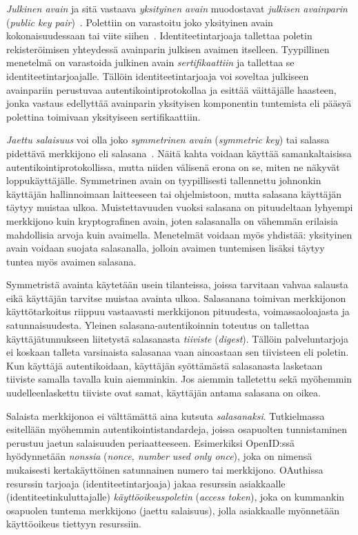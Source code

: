 \documentclass[finnish,gradu]{tktltiki}
\begin{document}
  \emph{Julkinen avain} ja sitä vastaava \emph{yksityinen avain} muodostavat \emph{julkisen avainparin} (\emph{public key pair})~\cite{NIST_SP800-63-1}. Polettiin on varastoitu joko yksityinen avain kokonaisuudessaan tai viite siihen~\cite{NIST_SP800-63-1}. Identiteetintarjoaja tallettaa poletin rekisteröimisen yhteydessä avainparin julkisen avaimen itselleen. Tyypillinen menetelmä on varastoida julkinen avain \emph{sertifikaattiin} ja tallettaa se identiteetintarjoajalle. Tällöin identiteetintarjoaja voi soveltaa julkiseen avainpariin perustuvaa autentikointiprotokollaa ja esittää väittäjälle haasteen, jonka vastaus edellyttää avainparin yksityisen komponentin tuntemista eli pääsyä polettina toimivaan yksityiseen sertifikaattiin.

  \emph{Jaettu salaisuus} voi olla joko \emph{symmetrinen avain} (\emph{symmetric key}) tai salassa pidettävä merkkijono eli salasana~\cite{NIST_SP800-63-1}. Näitä kahta voidaan käyttää samankaltaisissa autentikointiprotokollissa, mutta niiden välisenä erona on se, miten ne näkyvät loppukäyttäjälle. Symmetrinen avain on tyypillisesti tallennettu johnonkin käyttäjän hallinnoimaan laitteeseen tai ohjelmistoon, mutta salasana käyttäjän täytyy muistaa ulkoa. Muistettavuuden vuoksi salasana on pituudeltaan lyhyempi merkkijono kuin kryptografinen avain, joten salasanalla on vähemmän erilaisia mahdollisia arvoja kuin avaimella. Menetelmät voidaan myös yhdistää: yksityinen avain voidaan suojata salasanalla, jolloin avaimen tuntemisen lisäksi täytyy tuntea myös avaimen salasana.

  Symmetristä avainta käytetään usein tilanteissa, joissa tarvitaan vahvaa salausta eikä käyttäjän tarvitse muistaa avainta ulkoa. Salasanana toimivan merkkijonon käyttötarkoitus riippuu vastaavasti merkkijonon pituudesta, voimassaoloajasta ja satunnaisuudesta. Yleinen salasana-autentikoinnin toteutus on tallettaa käyttäjätunnukseen liitetystä salasanasta \emph{tiiviste} (\emph{digest}). Tällöin palveluntarjoja ei koskaan talleta varsinaista salasanaa vaan ainoastaan sen tiivisteen eli poletin. Kun käyttäjä autentikoidaan, käyttäjän syöttämästä salasanasta lasketaan tiiviste samalla tavalla kuin aiemminkin. Jos aiemmin talletettu sekä myöhemmin uudelleenlaskettu tiiviste ovat samat, käyttäjän antama salasana on oikea.

  Salaista merkkijonoa ei välttämättä aina kutsuta \emph{salasanaksi}. Tutkielmassa esitellään myöhemmin autentikointistandardeja, joissa osapuolten tunnistaminen perustuu jaetun salaisuuden periaatteeseen. Esimerkiksi OpenID:ssä hyödynnetään \emph{nonssia} (\emph{nonce, number used only once}), joka on nimensä mukaisesti kertakäyttöinen satunnainen numero tai merkkijono. OAuthissa resurssin tarjoaja (identiteetintarjoaja) jakaa resurssin asiakkaalle (identiteetinkuluttajalle) \emph{käyttöoikeuspoletin} (\emph{access token}), joka on kummankin osapuolen tuntema merkkijono (jaettu salaisuus), jolla asiakkaalle myönnetään käyttöoikeus tiettyyn resurssiin.
\end{document}
